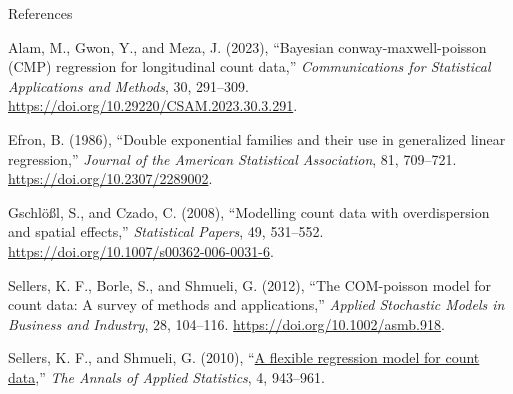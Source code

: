 \documentclass[
  ignorenonframetext,
]{beamer}
\newlength{\cslhangindent}
\newlength{\cslentryspacingunit} %
\newenvironment{CSLReferences}[2] %
 {%
  \setlength{\parindent}{0pt}
  \ifodd #1
  \let\oldpar\par
  \def\par{\hangindent=\cslhangindent\oldpar}
  \fi
  \setlength{\parskip}{#2\cslentryspacingunit}
 }%
 {}
\begin{document}
\begin{frame}{References}
\protect\hypertarget{references}{}
\hypertarget{refs}{}
\begin{CSLReferences}{1}{0}
\leavevmode{}%
Alam, M., Gwon, Y., and Meza, J. (2023), {``Bayesian
conway-maxwell-poisson ({CMP}) regression for longitudinal count
data,''} \emph{Communications for Statistical Applications and Methods},
30, 291--309. \url{https://doi.org/10.29220/CSAM.2023.30.3.291}.

\leavevmode{}%
Efron, B. (1986), {``Double exponential families and their use in
generalized linear regression,''} \emph{Journal of the American
Statistical Association}, 81, 709--721.
\url{https://doi.org/10.2307/2289002}.

\leavevmode{}%
Gschlößl, S., and Czado, C. (2008), {``Modelling count data with
overdispersion and spatial effects,''} \emph{Statistical Papers}, 49,
531--552. \url{https://doi.org/10.1007/s00362-006-0031-6}.

\leavevmode{}%
Sellers, K. F., Borle, S., and Shmueli, G. (2012), {``The {COM}-poisson
model for count data: A survey of methods and applications,''}
\emph{Applied Stochastic Models in Business and Industry}, 28, 104--116.
\url{https://doi.org/10.1002/asmb.918}.

\leavevmode{}%
Sellers, K. F., and Shmueli, G. (2010),
{``\href{https://www.jstor.org/stable/29765537}{A flexible regression
model for count data},''} \emph{The Annals of Applied Statistics}, 4,
943--961.

\end{CSLReferences}
\end{frame}
\end{document}
